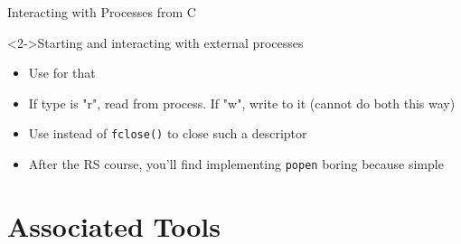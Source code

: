 \begin{Coupe}
\begin{frame}{Interacting with Processes from C}
  \begin{block}<2->{Starting and interacting with external processes}
    \begin{itemize}
    \item Use  for that
    \item If type is "r", read from process. If "w", write to it (cannot  do
      both this way)
    \item Use  instead of \texttt{fclose()} to
      close such a descriptor
    \item After the RS course, you'll find implementing \texttt{popen} boring
      because simple
    \end{itemize}
  \end{block}
\end{frame}
\end{Coupe}
\section{Associated Tools}\toc
